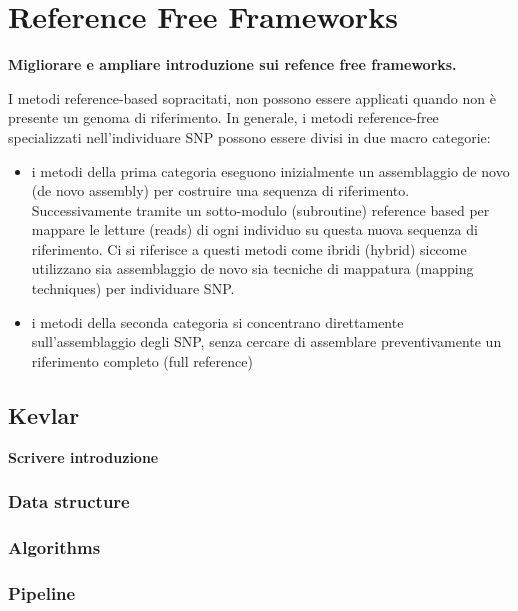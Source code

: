 \documentclass[../main.tex]{subfiles}
\begin{document}
\section{Reference Free Frameworks}
\begin{flushleft}
\textbf{Migliorare e ampliare introduzione sui refence free frameworks.}
\linebreak
\end{flushleft}
I metodi reference-based sopracitati, non possono essere applicati quando non è presente un genoma di riferimento. 
In generale, i metodi reference-free specializzati nell’individuare SNP possono essere divisi in due macro categorie: 
\begin{itemize} 
\item i metodi della prima categoria eseguono inizialmente un assemblaggio de novo (de novo assembly) per costruire una sequenza di riferimento. Successivamente tramite un sotto-modulo (subroutine) reference based per mappare le letture (reads) di ogni individuo su questa nuova sequenza di riferimento. Ci si riferisce a questi metodi come ibridi (hybrid) siccome utilizzano sia assemblaggio de novo sia tecniche di mappatura (mapping techniques) per individuare SNP.
\item i metodi della seconda categoria si concentrano direttamente sull’assemblaggio degli SNP, senza cercare di assemblare preventivamente un riferimento completo (full reference)
\end{itemize}

\subsection{Kevlar}

\textbf{Scrivere introduzione}

\subsubsection{Data structure}
\subsubsection{Algorithms}
\subsubsection{Pipeline}
\end{document}
